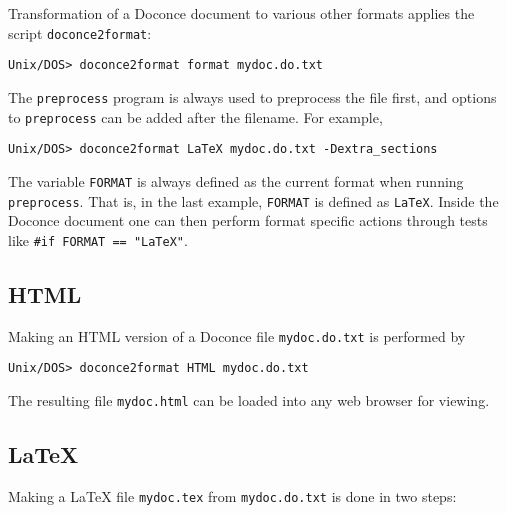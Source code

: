 \documentclass{article}
\begin{document}
Transformation of a Doconce document to various other
formats applies the script {\fontsize{10pt}{10pt}\verb!doconce2format!}:
\begin{Verbatim}[fontsize=\fontsize{9pt}{9pt},tabsize=8,baselinestretch=0.85,
fontfamily=tt,xleftmargin=7mm]
Unix/DOS> doconce2format format mydoc.do.txt
\end{Verbatim}
\noindent
The {\fontsize{10pt}{10pt}\verb!preprocess!} program is always used to preprocess the file first,
and options to {\fontsize{10pt}{10pt}\verb!preprocess!} can be added after the filename. For example,
\begin{Verbatim}[fontsize=\fontsize{9pt}{9pt},tabsize=8,baselinestretch=0.85,
fontfamily=tt,xleftmargin=7mm]
Unix/DOS> doconce2format LaTeX mydoc.do.txt -Dextra_sections
\end{Verbatim}
\noindent
The variable {\fontsize{10pt}{10pt}\verb!FORMAT!} is always defined as the current format when
running {\fontsize{10pt}{10pt}\verb!preprocess!}. That is, in the last example, {\fontsize{10pt}{10pt}\verb!FORMAT!} is
defined as {\fontsize{10pt}{10pt}\verb!LaTeX!}. Inside the Doconce document one can then perform
format specific actions through tests like {\fontsize{10pt}{10pt}\verb!#if FORMAT == "LaTeX"!}.

\subsection{HTML}

Making an HTML version of a Doconce file {\fontsize{10pt}{10pt}\verb!mydoc.do.txt!}
is performed by
\begin{Verbatim}[fontsize=\fontsize{9pt}{9pt},tabsize=8,baselinestretch=0.85,
fontfamily=tt,xleftmargin=7mm]
Unix/DOS> doconce2format HTML mydoc.do.txt
\end{Verbatim}
\noindent
The resulting file {\fontsize{10pt}{10pt}\verb!mydoc.html!} can be loaded into any web browser for viewing.

\subsection{{\LaTeX}}

Making a {\LaTeX} file {\fontsize{10pt}{10pt}\verb!mydoc.tex!} from {\fontsize{10pt}{10pt}\verb!mydoc.do.txt!} is done in two steps:
\end{document}
